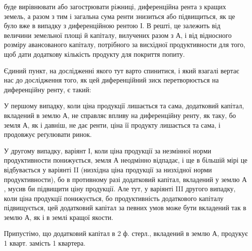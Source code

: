 \parcont{}  %
буде вирівнювати або загострювати ріжниці, диференційна рента з кращих земель,
а разом з тим і загальна сума ренти знизиться або підвищиться, як це було
вже в випадку з диференційною рентою І. В решті, це залежить від величини земельної
площі й капіталу, вилучених разом з $А$, і від відносного розміру авансованого
капіталу, потрібного за висхідної продуктивности для того, щоб дати
додаткову кількість продукту для покриття попиту.

Єдиний пункт, на дослідженні якого тут варто спинитися, і який взагалі
вертає нас до дослідження того, як цей диференційний зиск перетворюється
на диференційну ренту, є такий:

У першому випадку, коли ціна продукції лишається та сама, додатковий
капітал, вкладений в землю $А$, не справляє впливу на диференційну ренту, як
таку, бо земля $А$, як і давніш, не дає ренти, ціна її продукту лишається та
сама, і продовжує реґулювати ринок.

У другому випадку, варіянт І, коли ціна продукції за незмінної норми продуктивности
понижується, земля $А$ неодмінно відпадає, і ще в більшій мірі це
відбувається у варіянті II (низхідна ціна продукції за низхідної норми продуктивности),
бо в противному разі додатковий капітал, вкладений у землю $А$,
мусив би підвищити ціну продукції. Але тут, у варіянті III другого випадку,
коли ціна продукції понижується, бо продуктивність додаткового капіталу підвищується,
цей додатковий капітал за певних умов може бути вкладений так
в землю $А$, як і в землі кращої якости.

Припустімо, що додатковий капітал в 2 ф. стерл., вкладений в землю
$А$, продукує 1 кварт. замість 1 квартера.

